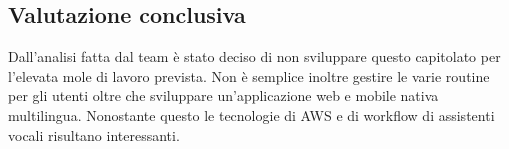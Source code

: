     \subsection{Valutazione conclusiva}
    Dall'analisi fatta dal team è stato deciso di non sviluppare questo capitolato per l'elevata mole di lavoro prevista.
    Non è semplice inoltre gestire le varie routine per gli utenti oltre che sviluppare un'applicazione web e mobile nativa multilingua.
    Nonostante questo le tecnologie di AWS e di workflow di assistenti vocali risultano interessanti.
